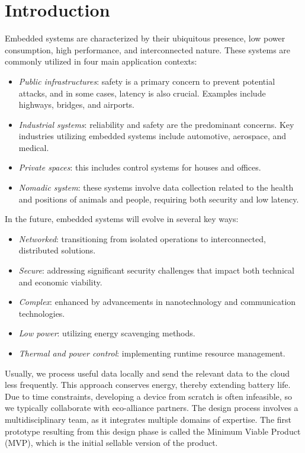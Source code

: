 \section{Introduction}

Embedded systems are characterized by their ubiquitous presence, low power consumption, high performance, and interconnected nature.
These systems are commonly utilized in four main application contexts:
\begin{itemize}
    \item \textit{Public infrastructures}: safety is a primary concern to prevent potential attacks, and in some cases, latency is also crucial. 
        Examples include highways, bridges, and airports.
    \item \textit{Industrial systems}: reliability and safety are the predominant concerns. 
        Key industries utilizing embedded systems include automotive, aerospace, and medical.
    \item \textit{Private spaces}: this includes control systems for houses and offices.
    \item \textit{Nomadic system}: these systems involve data collection related to the health and positions of animals and people, requiring both security and low latency.
\end{itemize}
In the future, embedded systems will evolve in several key ways:
\begin{itemize}
\item \textit{Networked}: transitioning from isolated operations to interconnected, distributed solutions.
\item \textit{Secure}: addressing significant security challenges that impact both technical and economic viability.
\item \textit{Complex}: enhanced by advancements in nanotechnology and communication technologies.
\item \textit{Low power}: utilizing energy scavenging methods.
\item \textit{Thermal and power control}: implementing runtime resource management.
\end{itemize}
Usually, we process useful data locally and send the relevant data to the cloud less frequently. 
This approach conserves energy, thereby extending battery life. 
Due to time constraints, developing a device from scratch is often infeasible, so we typically collaborate with eco-alliance partners. 
The design process involves a multidisciplinary team, as it integrates multiple domains of expertise. 
The first prototype resulting from this design phase is called the Minimum Viable Product (MVP), which is the initial sellable version of the product.

